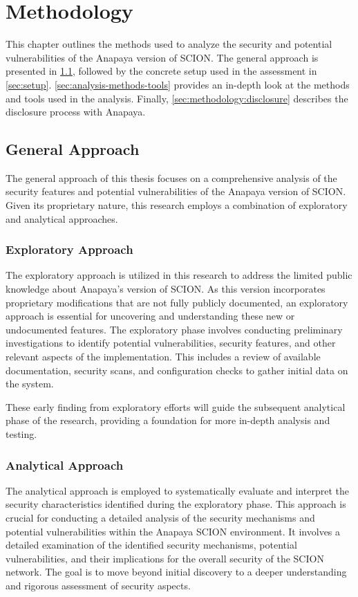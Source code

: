 \chapter{Methodology}
\label{ch:methodology}

This chapter outlines the methods used to analyze the security and potential vulnerabilities of the Anapaya version of SCION.
The general approach is presented in \cref{sec:general-approach}, followed by the concrete setup used in the assessment in \cref{sec:setup}.
\cref{sec:analysis-methods-tools} provides an in-depth look at the methods and tools used in the analysis.
Finally, \cref{sec:methodology:disclosure} describes the disclosure process with Anapaya.


\section{General Approach}
\label{sec:general-approach}
The general approach of this thesis focuses on a comprehensive analysis of the security features and potential vulnerabilities of the Anapaya version of SCION.
Given its proprietary nature, this research employs a combination of exploratory and analytical approaches.

\subsection{Exploratory Approach}
The exploratory approach is utilized in this research to address the limited public knowledge about Anapaya's version of SCION.
As this version incorporates proprietary modifications that are not fully publicly documented, an exploratory approach is essential for uncovering and understanding these new or undocumented features.
The exploratory phase involves conducting preliminary investigations to identify potential vulnerabilities, security features, and other relevant aspects of the implementation.
This includes a review of available documentation, security scans, and configuration checks to gather initial data on the system.

These early finding from exploratory efforts will guide the subsequent analytical phase of the research, providing a foundation for more in-depth analysis and testing.

\subsection{Analytical Approach}
The analytical approach is employed to systematically evaluate and interpret the security characteristics identified during the exploratory phase.
This approach is crucial for conducting a detailed analysis of the security mechanisms and potential vulnerabilities within the Anapaya SCION environment.
It involves a detailed examination of the identified security mechanisms, potential vulnerabilities, and their implications for the overall security of the SCION network.
The goal is to move beyond initial discovery to a deeper understanding and rigorous assessment of security aspects.


